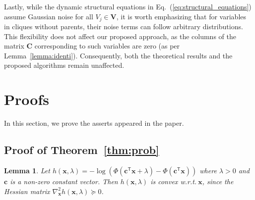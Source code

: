 \documentclass{article}
\theoremstyle{plain}
\newtheorem{lemma}[theorem]{Lemma}
\theoremstyle{definition}
\def \x {\mathbf{x}}
\def \V {\mathbf{V}}
\def \wrt {\textit{w.r.t.}$\ $}
\def \Eq {Eq.}
\def \x {\mathbf{x}}
\def \V {\mathbf{V}}
\def \c {\mathbf{c}}
\def \V {\mathbf{V}}
\def \C {\mathbf{C}}
\begin{document}
Lastly, while the dynamic structural equations in \Eq~(\ref{eq:structural_equations}) assume Gaussian noise for all $V_j\in \V$, it is worth emphasizing that for variables in cliques without parents, their noise terms can follow arbitrary distributions.  
This flexibility does not affect our proposed approach, as the columns of the matrix $\C$ corresponding to such variables are zero (as per Lemma~\ref{lemma:identi}).  
Consequently, both the theoretical results and the proposed algorithms remain unaffected.




\section{Proofs}
\label{app:proof}
In this section, we prove the asserts appeared in the paper.

\subsection{Proof of Theorem~\ref{thm:prob}}
\begin{lemma}
  \label{lemma:convex}
  Let $h\left(\x, \lambda\right) = -\log\left(\Phi\left(\c^\mathsf{T} \x + \lambda\right) - \Phi\left(\c^\mathsf{T} \x \right)\right)$ where $\lambda> 0$ and $\c$ is a non-zero constant vector.
  Then $h\left(\x, \lambda\right)$ is convex \wrt $\x$, since the Hessian matrix $\nabla^2_{\x} h\left(\x, \lambda\right) \succeq 0$.
\end{lemma}
\end{document}
